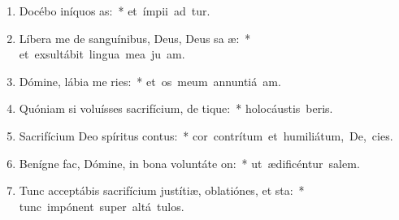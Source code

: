 \begin{flushleft}
\begin{enumerate}[leftmargin=*]
\item Docébo iníquos  as:~* \mbox{et ímpii ad  tur.}
\item Líbera me de sanguínibus, Deus, Deus sa æ:~* \mbox{et exsultábit lingua mea ju am.}
\item Dómine, lábia me ries:~* \mbox{et os meum annuntiá  am.}
\item Quóniam si voluísses sacrifícium, de tique:~* \mbox{holocáustis  beris.}
\item Sacrifícium Deo spíritus contus:~* \mbox{cor contrítum et humiliátum, De,  cies.}
\item Benígne fac, Dómine, in bona voluntáte  on:~* \mbox{ut ædificéntur  salem.}
\item Tunc acceptábis sacrifícium justítiæ, oblatiónes, et sta:~* \mbox{tunc impónent super altá  tulos.}

\end{enumerate}
\end{flushleft}


